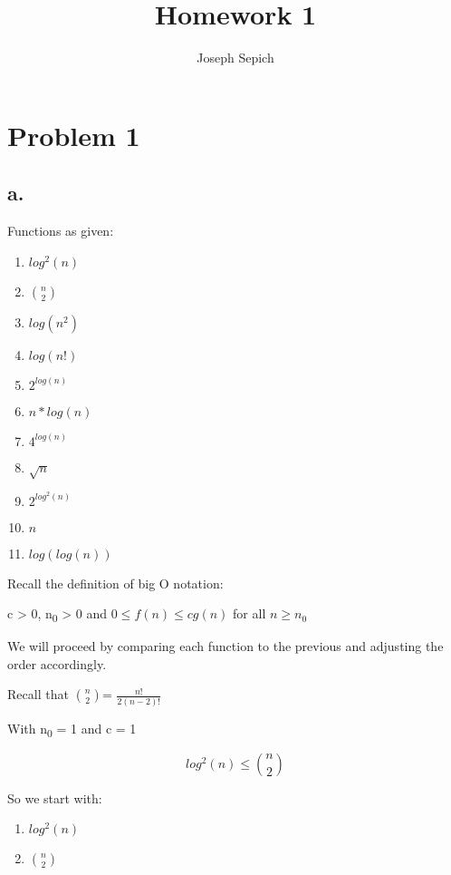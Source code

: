 \documentclass[]{article}
\title{Homework 1}
\subtitle{Joseph Sepich}
\author{}
\date{}
\providecommand{\tightlist}{%
  \setlength{\itemsep}{0pt}\setlength{\parskip}{0pt}}
\begin{document}
\maketitle

{
\setcounter{tocdepth}{2}
\tableofcontents
}
\section{Problem 1}\label{problem-1}

\subsection{a.}\label{a.}

Functions as given:

\begin{enumerate}
\def\labelenumi{\arabic{enumi}.}
\tightlist
\item
  \(log^2(n)\)
\item
  \(n \choose 2\)
\item
  \(log(n^2)\)
\item
  \(log(n!)\)
\item
  \(2^{log(n)}\)
\item
  \(n*log(n)\)
\item
  \(4^{log(n)}\)
\item
  \(\sqrt n\)
\item
  \(2^{log^2(n)}\)
\item
  \(n\)
\item
  \(log(log(n))\)
\end{enumerate}

Recall the definition of big O notation:

c \textgreater{} 0, n\textsubscript{0} \textgreater{} 0 and
\(0 \leq f(n) \leq cg(n)\) for all \(n \geq n_0\)

We will proceed by comparing each function to the previous and adjusting
the order accordingly.

Recall that \(n \choose 2\)= \(\frac{n!}{2(n-2)!}\)

With n\textsubscript{0} = 1 and c = 1

\[log^2(n) \leq \binom{n}{2} \]

So we start with:

\begin{enumerate}
\def\labelenumi{\arabic{enumi}.}
\tightlist
\item
  \(log^2(n)\)
\item
  \(n \choose 2\)
\end{enumerate}
\end{document}
